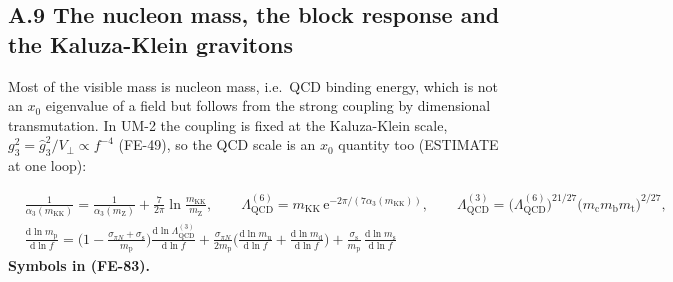 \documentclass[
  10pt,
]{article}
\begin{document}
\hypertarget{a.9-the-nucleon-mass-the-block-response-and-the-kaluza-klein-gravitons}{%
\subsection*{A.9 The nucleon mass, the block response and the
Kaluza-Klein
gravitons}\label{a.9-the-nucleon-mass-the-block-response-and-the-kaluza-klein-gravitons}}

Most of the visible mass is nucleon mass, i.e.~QCD binding energy, which
is not an \(x_0\) eigenvalue of a field but follows from the strong
coupling by dimensional transmutation. In UM-2 the coupling is fixed at
the Kaluza-Klein scale, \(g_3^2 = \hat g_3^2/V_\perp \propto f^{-4}\)
(FE-49), so the QCD scale is an \(x_0\) quantity too (ESTIMATE at one
loop):

\[
\begin{aligned}
&\frac{1}{\alpha_3(m_{\mathrm{KK}})} = \frac{1}{\alpha_3(m_{\mathrm{Z}})} +
 \frac{7}{2\pi}\ln\frac{m_{\mathrm{KK}}}{m_{\mathrm{Z}}},\qquad
 \Lambda_{\mathrm{QCD}}^{(6)} = m_{\mathrm{KK}}\,\mathrm{e}^{-2\pi/(7\alpha_3(m_{\mathrm{KK}}))},\qquad
 \Lambda_{\mathrm{QCD}}^{(3)} =
 \big(\Lambda_{\mathrm{QCD}}^{(6)}\big)^{21/27}\big(m_{\mathrm{c}}m_{\mathrm{b}}m_{\mathrm{t}}\big)^{2/27},\\
&\frac{\mathrm{d}\ln m_{\mathrm{p}}}{\mathrm{d}\ln f} = \Big(1 - \frac{\sigma_{\pi N} +
 \sigma_{\mathrm{s}}}{m_{\mathrm{p}}}\Big)
 \frac{\mathrm{d}\ln\Lambda_{\mathrm{QCD}}^{(3)}}{\mathrm{d}\ln f}
 + \frac{\sigma_{\pi N}}{2m_{\mathrm{p}}}\Big(\frac{\mathrm{d}\ln m_{\mathrm{u}}}{\mathrm{d}\ln f} +
 \frac{\mathrm{d}\ln m_{\mathrm{d}}}{\mathrm{d}\ln f}\Big)
 + \frac{\sigma_{\mathrm{s}}}{m_{\mathrm{p}}}\,\frac{\mathrm{d}\ln m_{\mathrm{s}}}{\mathrm{d}\ln f}
\end{aligned} \tag{FE-83}
\] \textbf{Symbols in (FE-83).}
\end{document}
